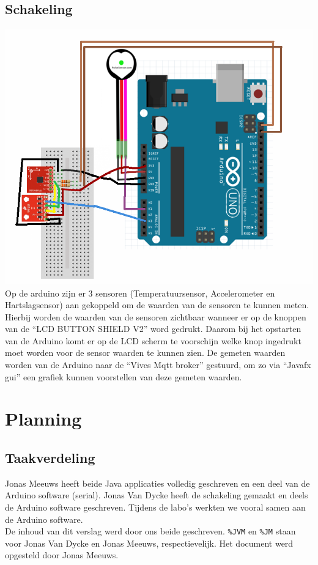\documentclass[a4paper]{report}
\begin{document}
    \section{Schakeling}
        \includegraphics[width=\textwidth]{schema}\\
        Op de arduino zijn er 3 sensoren (Temperatuursensor, Accelerometer en Hartslagsensor) aan gekoppeld om de waarden van de sensoren te kunnen meten.
        Hierbij worden de waarden van de sensoren zichtbaar wanneer er op de knoppen van de ``LCD BUTTON SHIELD V2'' word gedrukt.
        Daarom bij het opstarten van de Arduino komt er op de LCD scherm te voorschijn welke knop ingedrukt moet worden voor de sensor waarden te kunnen zien.
        De gemeten waarden worden van de Arduino naar de ``Vives Mqtt broker'' gestuurd, om zo via ``Javafx gui'' een grafiek kunnen voorstellen van deze gemeten waarden.
    
\chapter{Planning}
    \section{Taakverdeling}
        Jonas Meeuws heeft beide Java applicaties volledig geschreven en een deel van de Arduino software (serial).
        Jonas Van Dycke heeft de schakeling gemaakt en deels de Arduino software geschreven.
        Tijdens de labo's werkten we vooral samen aan de Arduino software.\\
        De inhoud van dit verslag werd door ons beide geschreven.
        \verb!%JVM! en \verb!%JM! staan voor Jonas Van Dycke en Jonas Meeuws, respectievelijk. 
        Het document werd opgesteld door Jonas Meeuws.
        
\end{document}
